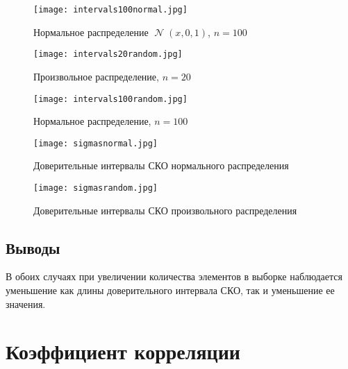\documentclass[14pt]{extarticle}
\DeclareMathOperator{\normal}{\mathcal{N}} %
\begin{document}
\begin{figure}[H]
    \centering
    \texttt{[image: intervals100normal.jpg]}
    \caption{Нормальное распределение \(\normal(x, 0, 1)\), \(n=100\)}
    \label{fig:enter-label}
\end{figure}

\begin{figure}[H]
    \centering
    \texttt{[image: intervals20random.jpg]}
    \caption{Произвольное распределение, \(n=20\)}
    \label{fig:enter-label}
\end{figure}

\begin{figure}[H]
    \centering
    \texttt{[image: intervals100random.jpg]}
    \caption{Нормальное распределение, \(n=100\)}
    \label{fig:enter-label}
\end{figure}

\begin{figure}[H]
    \centering
    \texttt{[image: sigmasnormal.jpg]}
    \caption{Доверительные интервалы СКО нормального распределения}
    \label{fig:enter-normal}
    \vspace{1cm}
    \texttt{[image: sigmasrandom.jpg]}
    \caption{Доверительные интервалы СКО произвольного распределения}
    \label{fig:random}
\end{figure}

\subsection{Выводы}
В обоих случаях при увеличении количества элементов в выборке наблюдается уменьшение как длины доверительного интервала СКО, так и уменьшение ее значения.

\section{Коэффициент корреляции}
\end{document}
